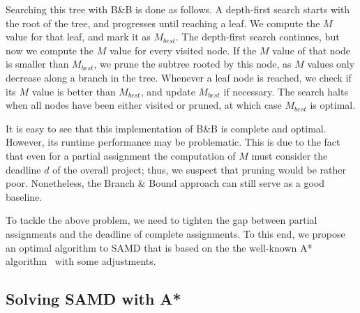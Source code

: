 \documentclass[letterpaper]{article} %
\newcommand{\samd}{\ac{SAMD}\xspace}
\newcommand{\astar}{\textsc{A*}\xspace}
\newcommand{\bnb}{\textsc{B\&B}\xspace}
\begin{document}
Searching this tree with \bnb is done as follows. A depth-first search starts with the root of the tree, and progresses until reaching a leaf. We compute the $M$ value for that leaf, and mark it as $M_{best}$. The depth-first search continues, but now we compute the $M$ value for every visited node. If the $M$ value of that node is smaller than $M_{best}$, we prune the subtree rooted by this node, as $M$ values only decrease along a branch in the tree. Whenever a leaf node is reached, we check if its $M$ value is better than $M_{best}$, and update $M_{best}$ if necessary. The search halts when all nodes have been either visited or pruned, at which case $M_{best}$ is optimal. %

It is easy to see that this implementation of \bnb is complete and optimal. However, its runtime performance may be problematic. This is due to the fact that even for a partial assignment the computation of $M$ must consider the deadline $d$ of the overall project; thus, we suspect that pruning would be rather poor. Nonetheless, the Branch \& Bound approach can still serve as a good baseline.

To tackle the above problem, we need to tighten the gap between partial assignments and the deadline of complete assignments. To this end, we propose an optimal algorithm to \samd that is based on the the well-known \astar algorithm~\cite{hart1968formal} with some adjustments. 



\subsection{Solving \samd with \astar}
\label{sec:astar}
\end{document}
